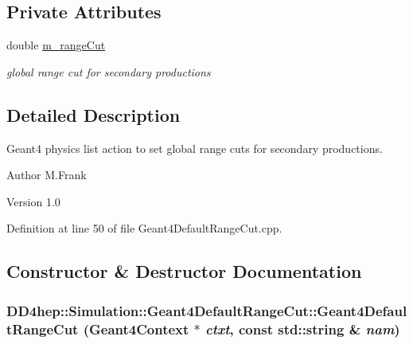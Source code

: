 \subsection*{Private Attributes}
\begin{DoxyCompactItemize}
\item 
double \hyperlink{class_d_d4hep_1_1_simulation_1_1_geant4_default_range_cut_a3a03ddf8f442cefe710b25930bd07f50}{m\_\-rangeCut}
\begin{DoxyCompactList}\small\item\em global range cut for secondary productions \item\end{DoxyCompactList}\end{DoxyCompactItemize}


\subsection{Detailed Description}
Geant4 physics list action to set global range cuts for secondary productions. \begin{DoxyAuthor}{Author}
M.Frank 
\end{DoxyAuthor}
\begin{DoxyVersion}{Version}
1.0 
\end{DoxyVersion}


Definition at line 50 of file Geant4DefaultRangeCut.cpp.

\subsection{Constructor \& Destructor Documentation}
\hypertarget{class_d_d4hep_1_1_simulation_1_1_geant4_default_range_cut_ab3e4d2b49a9aab9f42d04f5c73f7e5b4}{
\subsubsection[{Geant4DefaultRangeCut}]{\setlength{\rightskip}{0pt plus 5cm}DD4hep::Simulation::Geant4DefaultRangeCut::Geant4DefaultRangeCut ({\bf Geant4Context} $\ast$ {\em ctxt}, \/  const std::string \& {\em nam})}}
\label{class_d_d4hep_1_1_simulation_1_1_geant4_default_range_cut_ab3e4d2b49a9aab9f42d04f5c73f7e5b4}


